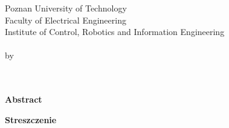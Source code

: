\newpage
\thispagestyle{empty}
\begin{center}
Poznan University of Technology\\
Faculty of Electrical Engineering\\
Institute of Control, Robotics and Information Engineering\\
  \vspace{10mm}
\huge{\TytulAngielski} \\
\large{by}\\
\large{\StudentA}\\
\large{\StudentB}\\
  \vspace{10mm}

\normalsize\textbf{Abstract} \\
{} 

\end{center}

\begin{center}
 \textbf{Streszczenie} \\
 {} 
\end{center}

 
